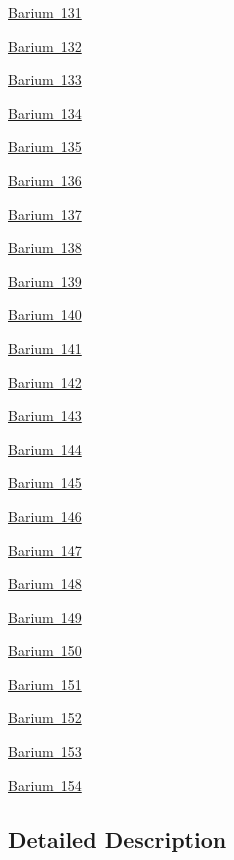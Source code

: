 \begin{DoxyCompactItemize}
\item 
\mbox{\hyperlink{group___isotope_const-_barium-_ba131}{Barium 131}}
\item 
\mbox{\hyperlink{group___isotope_const-_barium-_ba132}{Barium 132}}
\item 
\mbox{\hyperlink{group___isotope_const-_barium-_ba133}{Barium 133}}
\item 
\mbox{\hyperlink{group___isotope_const-_barium-_ba134}{Barium 134}}
\item 
\mbox{\hyperlink{group___isotope_const-_barium-_ba135}{Barium 135}}
\item 
\mbox{\hyperlink{group___isotope_const-_barium-_ba136}{Barium 136}}
\item 
\mbox{\hyperlink{group___isotope_const-_barium-_ba137}{Barium 137}}
\item 
\mbox{\hyperlink{group___isotope_const-_barium-_ba138}{Barium 138}}
\item 
\mbox{\hyperlink{group___isotope_const-_barium-_ba139}{Barium 139}}
\item 
\mbox{\hyperlink{group___isotope_const-_barium-_ba140}{Barium 140}}
\item 
\mbox{\hyperlink{group___isotope_const-_barium-_ba141}{Barium 141}}
\item 
\mbox{\hyperlink{group___isotope_const-_barium-_ba142}{Barium 142}}
\item 
\mbox{\hyperlink{group___isotope_const-_barium-_ba143}{Barium 143}}
\item 
\mbox{\hyperlink{group___isotope_const-_barium-_ba144}{Barium 144}}
\item 
\mbox{\hyperlink{group___isotope_const-_barium-_ba145}{Barium 145}}
\item 
\mbox{\hyperlink{group___isotope_const-_barium-_ba146}{Barium 146}}
\item 
\mbox{\hyperlink{group___isotope_const-_barium-_ba147}{Barium 147}}
\item 
\mbox{\hyperlink{group___isotope_const-_barium-_ba148}{Barium 148}}
\item 
\mbox{\hyperlink{group___isotope_const-_barium-_ba149}{Barium 149}}
\item 
\mbox{\hyperlink{group___isotope_const-_barium-_ba150}{Barium 150}}
\item 
\mbox{\hyperlink{group___isotope_const-_barium-_ba151}{Barium 151}}
\item 
\mbox{\hyperlink{group___isotope_const-_barium-_ba152}{Barium 152}}
\item 
\mbox{\hyperlink{group___isotope_const-_barium-_ba153}{Barium 153}}
\item 
\mbox{\hyperlink{group___isotope_const-_barium-_ba154}{Barium 154}}
\end{DoxyCompactItemize}


\subsection{Detailed Description}
